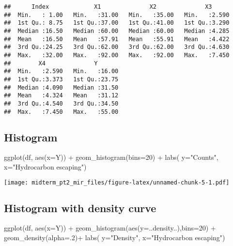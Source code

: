 \documentclass[
]{article}
\newenvironment{Shaded}{\begin{snugshade}}{\end{snugshade}}
\newcommand{\AttributeTok}[1]{\textcolor[rgb]{0.77,0.63,0.00}{#1}}
\newcommand{\DecValTok}[1]{\textcolor[rgb]{0.00,0.00,0.81}{#1}}
\newcommand{\FunctionTok}[1]{\textcolor[rgb]{0.00,0.00,0.00}{#1}}
\newcommand{\NormalTok}[1]{#1}
\newcommand{\SpecialCharTok}[1]{\textcolor[rgb]{0.00,0.00,0.00}{#1}}
\newcommand{\StringTok}[1]{\textcolor[rgb]{0.31,0.60,0.02}{#1}}
\begin{document}
\begin{verbatim}
##      Index             X1              X2              X3       
##  Min.   : 1.00   Min.   :31.00   Min.   :35.00   Min.   :2.590  
##  1st Qu.: 8.75   1st Qu.:37.00   1st Qu.:41.00   1st Qu.:3.290  
##  Median :16.50   Median :60.00   Median :60.00   Median :4.285  
##  Mean   :16.50   Mean   :57.91   Mean   :55.91   Mean   :4.422  
##  3rd Qu.:24.25   3rd Qu.:62.00   3rd Qu.:62.00   3rd Qu.:4.630  
##  Max.   :32.00   Max.   :92.00   Max.   :92.00   Max.   :7.450  
##        X4              Y        
##  Min.   :2.590   Min.   :16.00  
##  1st Qu.:3.373   1st Qu.:23.75  
##  Median :4.090   Median :31.50  
##  Mean   :4.324   Mean   :31.12  
##  3rd Qu.:4.540   3rd Qu.:34.50  
##  Max.   :7.450   Max.   :55.00
\end{verbatim}

\hypertarget{histogram}{%
\subsection{Histogram}\label{histogram}}

\begin{Shaded}
\begin{Highlighting}[]
\FunctionTok{ggplot}\NormalTok{(df, }\FunctionTok{aes}\NormalTok{(}\AttributeTok{x=}\NormalTok{Y)) }\SpecialCharTok{+} \FunctionTok{geom\_histogram}\NormalTok{(}\AttributeTok{bins=}\DecValTok{20}\NormalTok{) }\SpecialCharTok{+} \FunctionTok{labs}\NormalTok{( }\AttributeTok{y=}\StringTok{"Counts"}\NormalTok{, }\AttributeTok{x=}\StringTok{"Hydrocarbon escaping"}\NormalTok{)}
\end{Highlighting}
\end{Shaded}

\texttt{[image: midterm\_pt2\_mir\_files/figure-latex/unnamed-chunk-5-1.pdf]}

\hypertarget{histogram-with-density-curve}{%
\subsection{Histogram with density
curve}\label{histogram-with-density-curve}}

\begin{Shaded}
\begin{Highlighting}[]
\FunctionTok{ggplot}\NormalTok{(df, }\FunctionTok{aes}\NormalTok{(}\AttributeTok{x=}\NormalTok{Y)) }\SpecialCharTok{+} \FunctionTok{geom\_histogram}\NormalTok{(}\FunctionTok{aes}\NormalTok{(}\AttributeTok{y=}\NormalTok{..density..),}\AttributeTok{bins=}\DecValTok{20}\NormalTok{) }\SpecialCharTok{+} \FunctionTok{geom\_density}\NormalTok{(}\AttributeTok{alpha=}\NormalTok{.}\DecValTok{2}\NormalTok{)}\SpecialCharTok{+} \FunctionTok{labs}\NormalTok{( }\AttributeTok{y=}\StringTok{"Density"}\NormalTok{, }\AttributeTok{x=}\StringTok{"Hydrocarbon escaping"}\NormalTok{)}
\end{Highlighting}
\end{Shaded}
\end{document}
